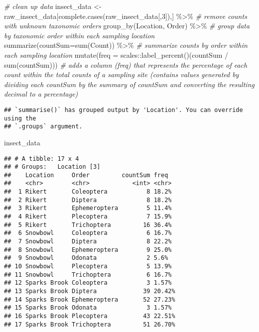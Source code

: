 \documentclass[
]{article}
\newenvironment{Shaded}{\begin{snugshade}}{\end{snugshade}}
\newcommand{\AttributeTok}[1]{\textcolor[rgb]{0.77,0.63,0.00}{#1}}
\newcommand{\CommentTok}[1]{\textcolor[rgb]{0.56,0.35,0.01}{\textit{#1}}}
\newcommand{\DecValTok}[1]{\textcolor[rgb]{0.00,0.00,0.81}{#1}}
\newcommand{\FunctionTok}[1]{\textcolor[rgb]{0.00,0.00,0.00}{#1}}
\newcommand{\NormalTok}[1]{#1}
\newcommand{\OtherTok}[1]{\textcolor[rgb]{0.56,0.35,0.01}{#1}}
\newcommand{\SpecialCharTok}[1]{\textcolor[rgb]{0.00,0.00,0.00}{#1}}
\begin{document}
\begin{Shaded}
\begin{Highlighting}[]
\CommentTok{\# clean up data}
\NormalTok{insect\_data }\OtherTok{\textless{}{-}}\NormalTok{ raw\_insect\_data[}\FunctionTok{complete.cases}\NormalTok{(raw\_insect\_data[,}\DecValTok{3}\NormalTok{]),] }\SpecialCharTok{\%\textgreater{}\%}  \CommentTok{\# remove counts with unknown taxonomic orders}
  \FunctionTok{group\_by}\NormalTok{(Location, Order) }\SpecialCharTok{\%\textgreater{}\%}  \CommentTok{\# group data by taxonomic order within each sampling location}
  \FunctionTok{summarize}\NormalTok{(}\AttributeTok{countSum=}\FunctionTok{sum}\NormalTok{(Count)) }\SpecialCharTok{\%\textgreater{}\%}  \CommentTok{\# summarize counts by order within each sampling location }
  \FunctionTok{mutate}\NormalTok{(}\AttributeTok{freq =}\NormalTok{ scales}\SpecialCharTok{::}\FunctionTok{label\_percent}\NormalTok{()(countSum }\SpecialCharTok{/} \FunctionTok{sum}\NormalTok{(countSum)))  }\CommentTok{\# adds a column (\textquotesingle{}freq\textquotesingle{}) that represents the percentage of each count within the total counts of a sampling site (contains values generated by dividing each countSum by the summary of countSum and converting the resulting decimal to a percentage)}
\end{Highlighting}
\end{Shaded}

\begin{verbatim}
## `summarise()` has grouped output by 'Location'. You can override using the
## `.groups` argument.
\end{verbatim}

\begin{Shaded}
\begin{Highlighting}[]
\NormalTok{insect\_data}
\end{Highlighting}
\end{Shaded}

\begin{verbatim}
## # A tibble: 17 x 4
## # Groups:   Location [3]
##    Location     Order         countSum freq  
##    <chr>        <chr>            <int> <chr> 
##  1 Rikert       Coleoptera           8 18.2% 
##  2 Rikert       Diptera              8 18.2% 
##  3 Rikert       Ephemeroptera        5 11.4% 
##  4 Rikert       Plecoptera           7 15.9% 
##  5 Rikert       Trichoptera         16 36.4% 
##  6 Snowbowl     Coleoptera           6 16.7% 
##  7 Snowbowl     Diptera              8 22.2% 
##  8 Snowbowl     Ephemeroptera        9 25.0% 
##  9 Snowbowl     Odonata              2 5.6%  
## 10 Snowbowl     Plecoptera           5 13.9% 
## 11 Snowbowl     Trichoptera          6 16.7% 
## 12 Sparks Brook Coleoptera           3 1.57% 
## 13 Sparks Brook Diptera             39 20.42%
## 14 Sparks Brook Ephemeroptera       52 27.23%
## 15 Sparks Brook Odonata              3 1.57% 
## 16 Sparks Brook Plecoptera          43 22.51%
## 17 Sparks Brook Trichoptera         51 26.70%
\end{verbatim}
\end{document}
